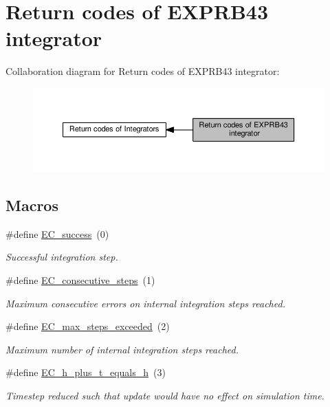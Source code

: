 \hypertarget{group__exprb43__ErrCodes}{}\section{Return codes of E\+X\+P\+R\+B43 integrator}
\label{group__exprb43__ErrCodes}
Collaboration diagram for Return codes of E\+X\+P\+R\+B43 integrator\+:
\nopagebreak
\begin{figure}[H]
\begin{center}
\leavevmode
\includegraphics[width=350pt]{group__exprb43__ErrCodes}
\end{center}
\end{figure}
\subsection*{Macros}
\begin{DoxyCompactItemize}
\item 
\#define \hyperlink{group__exprb43__ErrCodes_gabd83bc0f9f475a2189a4db4a08b790ca}{E\+C\+\_\+success}~(0)
\begin{DoxyCompactList}\small\item\em Successful integration step. \end{DoxyCompactList}\item 
\#define \hyperlink{group__exprb43__ErrCodes_gae0287841c08f86f5709660fd731615ad}{E\+C\+\_\+consecutive\+\_\+steps}~(1)
\begin{DoxyCompactList}\small\item\em Maximum consecutive errors on internal integration steps reached. \end{DoxyCompactList}\item 
\#define \hyperlink{group__exprb43__ErrCodes_ga0f0275d9851ab5c19b79a963d5084df3}{E\+C\+\_\+max\+\_\+steps\+\_\+exceeded}~(2)
\begin{DoxyCompactList}\small\item\em Maximum number of internal integration steps reached. \end{DoxyCompactList}\item 
\#define \hyperlink{group__exprb43__ErrCodes_ga9326efd544880e2683c4453365ca2704}{E\+C\+\_\+h\+\_\+plus\+\_\+t\+\_\+equals\+\_\+h}~(3)
\begin{DoxyCompactList}\small\item\em Timestep reduced such that update would have no effect on simulation time. \end{DoxyCompactList}\end{DoxyCompactItemize}


